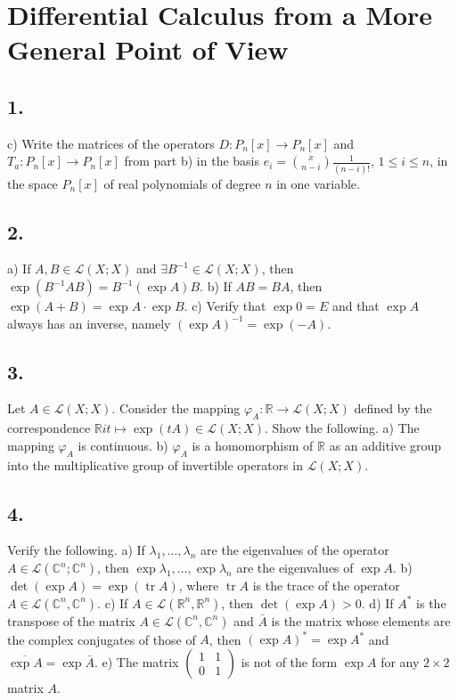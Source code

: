 \section*{Differential Calculus from a More General Point of View}

\subsection*{1.}
c) Write the matrices of the operators $D:P_n[x] \rightarrow P_n[x]$ and $T_a : P_n[x] \rightarrow P_n[x]$ from part b) in the basis $e_i = \binom{x}{n-i} \frac{1}{(n-i)!}$, $1 \le i \le n$, in the space $P_n[x]$ of real polynomials of degree $n$ in one variable.

\subsection*{2.}
a) If $A, B \in \mathcal{L}(X; X)$ and $\exists B^{-1} \in \mathcal{L}(X; X)$, then $\exp(B^{-1}AB) = B^{-1} (\exp A)B.$
b) If $AB = BA$, then $\exp(A + B) = \exp A \cdot \exp B.$
c) Verify that $\exp 0 = E$ and that $\exp A$ always has an inverse, namely $(\exp A)^{-1} = \exp(-A).$

\subsection*{3.}
Let $A \in \mathcal{L}(X; X)$. Consider the mapping $\varphi_A : \mathbb{R} \rightarrow \mathcal{L}(X; X)$ defined by the correspondence $\mathbb{R} 
i t \mapsto \exp(tA) \in \mathcal{L}(X; X)$. Show the following.
a) The mapping $\varphi_A$ is continuous.
b) $\varphi_A$ is a homomorphism of $\mathbb{R}$ as an additive group into the multiplicative group of invertible operators in $\mathcal{L}(X; X).$

\subsection*{4.}
Verify the following.
a) If $\lambda_1,\dots,\lambda_n$ are the eigenvalues of the operator $A \in \mathcal{L}(\mathbb{C}^n; \mathbb{C}^n)$, then $\exp \lambda_1, \dots, \exp \lambda_n$ are the eigenvalues of $\exp A.$
b) $\det(\exp A) = \exp(\operatorname{tr} A)$, where $\operatorname{tr} A$ is the trace of the operator $A \in \mathcal{L}(\mathbb{C}^n, \mathbb{C}^n).$
c) If $A \in \mathcal{L}(\mathbb{R}^n, \mathbb{R}^n)$, then $\det(\exp A) > 0.$
d) If $A^*$ is the transpose of the matrix $A \in \mathcal{L}(\mathbb{C}^n, \mathbb{C}^n)$ and $\bar{A}$ is the matrix whose elements are the complex conjugates of those of $A$, then $(\exp A)^* = \exp A^*$ and $\overline{\exp A} = \exp \bar{A}.$
e) The matrix $\begin{pmatrix} 1 & 1 \\ 0 & 1 \end{pmatrix}$ is not of the form $\exp A$ for any $2 \times 2$ matrix $A.$

